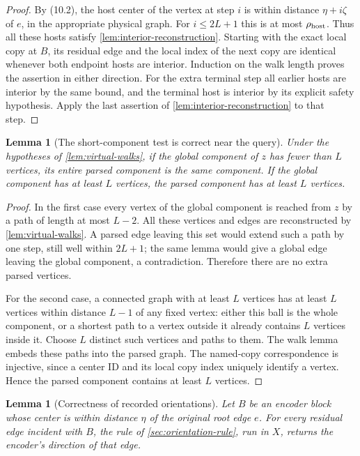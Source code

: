 \documentclass[11pt]{article}
\newtheorem{lemma}[theorem]{Lemma}
\theoremstyle{definition}
\theoremstyle{remark}
\begin{document}
\begin{proof}
By (10.2), the host center of the vertex at step $i$ is within distance
$\eta+i\zeta$ of $e$, in the appropriate physical graph.  For
$i\le2L+1$ this is at most $\rho_{\rm host}$.  Thus all these hosts
satisfy \cref{lem:interior-reconstruction}.  Starting with the exact local
copy at $B$, its residual edge and the local index of the next copy are
identical whenever both endpoint hosts are interior.  Induction on the
walk length proves the assertion in either direction.  For the extra
terminal step all earlier hosts are interior by the same bound, and
the terminal host is interior by its explicit safety hypothesis.  Apply
the last assertion of \cref{lem:interior-reconstruction} to that step.
\end{proof}

\begin{lemma}[The short-component test is correct near the query]
\label{lem:short-test}
Under the hypotheses of \cref{lem:virtual-walks}, if the global component
of $z$ has fewer than $L$ vertices, its entire parsed component is the
same component.  If the global component has at least $L$ vertices,
the parsed component has at least $L$ vertices.
\end{lemma}

\begin{proof}
In the first case every vertex of the global component is reached from
$z$ by a path of length at most $L-2$.  All these vertices and edges are
reconstructed by \cref{lem:virtual-walks}.  A parsed edge leaving this
set would extend such a path by one step, still well within $2L+1$;
the same lemma would give a global edge leaving the global component,
a contradiction.  Therefore there are no extra parsed vertices.

For the second case, a connected graph with at least $L$ vertices has
at least $L$ vertices within distance $L-1$ of any fixed vertex: either
this ball is the whole component, or a shortest path to a vertex outside
it already contains $L$ vertices inside it.  Choose $L$ distinct such
vertices and paths to them.  The walk lemma embeds these paths into the
parsed graph.  The named-copy correspondence is injective, since a center
ID and its local copy index uniquely identify a vertex.  Hence the parsed
component contains at least $L$ vertices.
\end{proof}

\begin{lemma}[Correctness of recorded orientations]
\label{lem:orientation-correct}
Let $B$ be an encoder block whose center is within distance $\eta$ of
the original root edge $e$.  For every residual edge incident with $B$,
the rule of \cref{sec:orientation-rule}, run in $X$, returns the encoder's
direction of that edge.
\end{lemma}
\end{document}
